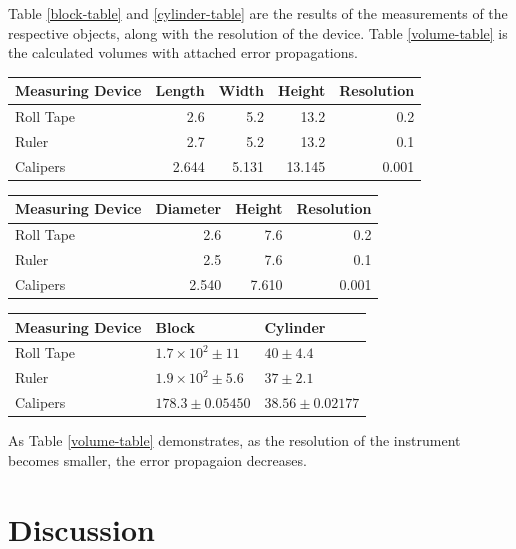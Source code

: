 \documentclass[12pt]{article}
\begin{document}
Table \ref{block-table} and \ref{cylinder-table} are the results of the measurements of the respective objects, along with the resolution of the device. Table \ref{volume-table} is the calculated volumes with attached error propagations.

\begin{center}
\begin{tabular}{l|r|r|r|r}
Measuring Device & Length & Width & Height & Resolution\\
\hline
Roll Tape & 2.6 & 5.2 & 13.2 & 0.2\\
Ruler & 2.7 & 5.2 & 13.2 & 0.1\\
Calipers & 2.644 & 5.131 & 13.145 & 0.001\\
\end{tabular}
\end{center}


\begin{center}
\begin{tabular}{l|r|r|r}
Measuring Device & Diameter & Height & Resolution\\
\hline
Roll Tape & 2.6 & 7.6 & 0.2\\
Ruler & 2.5 & 7.6 & 0.1\\
Calipers & 2.540 & 7.610 & 0.001\\
\end{tabular}
\end{center}

\begin{center}
\begin{tabular}{l|l|l}
Measuring Device & Block & Cylinder\\
\hline
Roll Tape & \(1.7\times10^2\pm11\) & \(40\pm4.4\)\\
Ruler & \(1.9\times10^{2}\pm5.6\) & \(37\pm2.1\)\\
Calipers & \(178.3\pm0.05450\) & \(38.56\pm0.02177\)\\
\end{tabular}
\end{center}

As Table \ref{volume-table} demonstrates, as the resolution of the instrument becomes smaller, the error propagaion decreases.
\section{Discussion}
\label{sec:org671ac6f}
\end{document}
